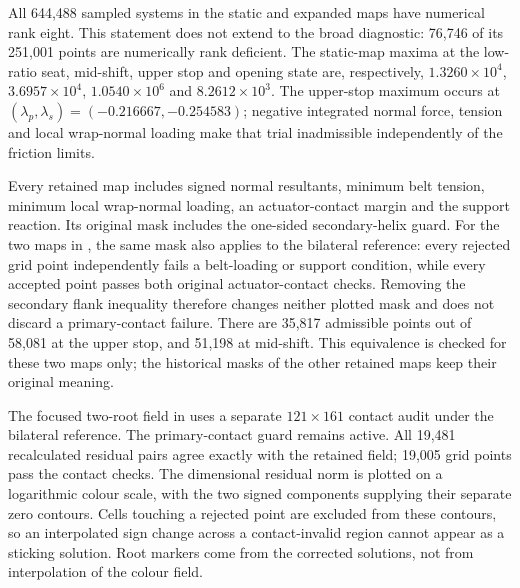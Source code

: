 \documentclass[11pt]{report}
\numberwithin{equation}{section}
\begin{document}
All 644,488 sampled systems in the static and expanded maps have numerical
rank eight. This statement does not extend to the broad diagnostic: 76,746
of its 251,001 points are numerically rank deficient. The static-map maxima at the low-ratio seat, mid-shift, upper stop and
opening state are, respectively,
\(1.3260\times10^4\), \(3.6957\times10^4\), \(1.0540\times10^6\) and
\(8.2612\times10^3\). The upper-stop maximum occurs at
\((\lambda_p,\lambda_s)=(-0.216667,-0.254583)\); negative integrated
normal force, tension and local wrap-normal loading make that trial
inadmissible independently of the friction limits.

Every retained map includes signed normal resultants, minimum belt tension,
minimum local wrap-normal loading, an actuator-contact margin and the support
reaction. Its original mask includes the one-sided secondary-helix guard.
For the two maps in , the same mask
also applies to the bilateral reference: every rejected grid point independently
fails a belt-loading or support condition, while every accepted point passes
both original actuator-contact checks. Removing the secondary flank inequality
therefore changes neither plotted mask and does not discard a primary-contact
failure. There are 35,817 admissible points out of 58,081 at the upper stop,
and 51,198 at mid-shift. This equivalence is checked for these two maps only;
the historical masks of the other retained maps keep their original meaning.

The focused two-root field in  uses a
separate \(121\times161\) contact audit under the bilateral reference.
The primary-contact guard remains active. All 19,481 recalculated residual
pairs agree exactly with the retained field; 19,005 grid points pass the
contact checks. The dimensional residual norm is plotted on a logarithmic
colour scale, with the two signed components supplying their separate zero
contours. Cells touching a rejected point are excluded from these contours,
so an interpolated sign change across a contact-invalid region cannot appear
as a sticking solution. Root markers come from the corrected solutions, not
from interpolation of the colour field.
\end{document}
